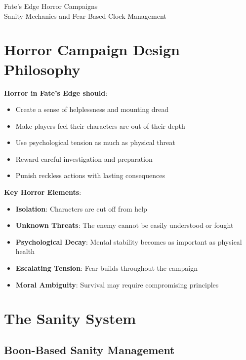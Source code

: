 \documentclass[11pt]{article}
\begin{document}
\begin{center}
{\LARGE Fate's Edge Horror Campaigns}\\
\vspace{0.5em}
{\large Sanity Mechanics and Fear-Based Clock Management}
\end{center}

\section*{Horror Campaign Design Philosophy}

\begin{mdframed}[backgroundcolor=horrorbg]
\textbf{Horror in Fate's Edge should}:
\begin{itemize}[leftmargin=*]
\item Create a sense of helplessness and mounting dread
\item Make players feel their characters are out of their depth
\item Use psychological tension as much as physical threat
\item Reward careful investigation and preparation
\item Punish reckless actions with lasting consequences
\end{itemize}

\textbf{Key Horror Elements}:
\begin{itemize}[leftmargin=*]
\item \textbf{Isolation}: Characters are cut off from help
\item \textbf{Unknown Threats}: The enemy cannot be easily understood or fought
\item \textbf{Psychological Decay}: Mental stability becomes as important as physical health
\item \textbf{Escalating Tension}: Fear builds throughout the campaign
\item \textbf{Moral Ambiguity}: Survival may require compromising principles
\end{itemize}
\end{mdframed}

\section*{The Sanity System}

\subsection*{Boon-Based Sanity Management}
\end{document}
